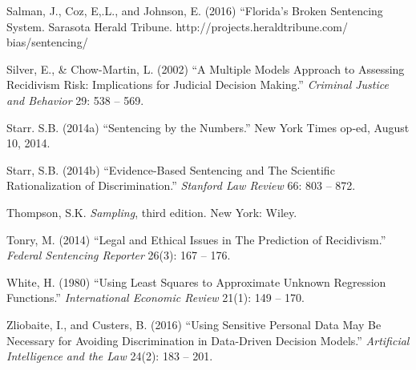 \documentclass[12pt]{article}
\begin{document}
\begin{description}
\item
Salman, J., Coz, E,.L., and Johnson, E. (2016) ``Florida's Broken Sentencing System. Sarasota Herald Tribune. http://projects.heraldtribune.com/ bias/sentencing/
\item
Silver, E., \& Chow-Martin, L. (2002) ``A Multiple Models Approach to Assessing Recidivism Risk: Implications for Judicial Decision Making.'' \textit{Criminal Justice and Behavior} 29: 538 -- 569.
\item
Starr. S.B. (2014a) ``Sentencing by the Numbers.'' New York Times op-ed, August 10, 2014.
\item
Starr, S.B. (2014b) ``Evidence-Based Sentencing and The Scientific Rationalization of Discrimination.'' \textit{Stanford Law Review} 66: 803 -- 872.
\item
Thompson, S.K. \textit{Sampling}, third edition. New York: Wiley.
\item
Tonry, M. (2014) ``Legal and Ethical Issues in The Prediction of Recidivism.'' \textit{Federal Sentencing Reporter} 26(3): 167 -- 176.
\item
White, H. (1980) ``Using Least Squares to Approximate Unknown Regression Functions.'' \textit{International Economic Review} 21(1): 149 -- 170. 
\item
Zliobaite, I., and Custers, B. (2016) ``Using Sensitive Personal Data May Be Necessary for Avoiding Discrimination in Data-Driven Decision Models.'' \textit{Artificial Intelligence and the Law} 24(2): 183 -- 201.

\end{description}
\end{document}
